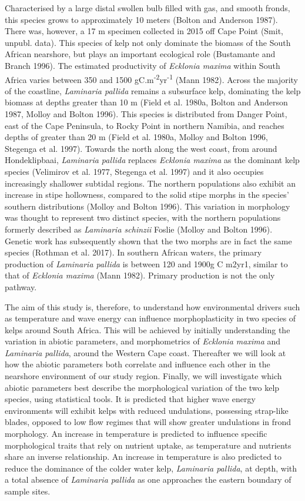 \documentclass[10pt,a4,]{article}
\begin{document}
Characterised by a large distal swollen bulb filled with gas, and smooth
fronds, this species grows to approximately 10 meters (Bolton and
Anderson 1987). There was, however, a 17 m specimen collected in 2015
off Cape Point (Smit, unpubl. data). This species of kelp not only
dominate the biomass of the South African nearshore, but plays an
important ecological role (Bustamante and Branch 1996). The estimated
productivity of \emph{Ecklonia maxima} within South Africa varies
between 350 and 1500 gC.m\textsuperscript{-2}yr\textsuperscript{-1}
(Mann 1982). Across the majority of the coastline, \emph{Laminaria
pallida} remains a subsurface kelp, dominating the kelp biomass at
depths greater than 10 m (Field et al. 1980a, Bolton and Anderson 1987,
Molloy and Bolton 1996). This species is distributed from Danger Point,
east of the Cape Peninsula, to Rocky Point in northern Namibia, and
reaches depths of greater than 20 m (Field et al. 1980a, Molloy and
Bolton 1996, Stegenga et al. 1997). Towards the north along the west
coast, from around Hondeklipbaai, \emph{Laminaria pallida} replaces
\emph{Ecklonia maxima} as the dominant kelp species (Velimirov et al.
1977, Stegenga et al. 1997) and it also occupies increasingly shallower
subtidal regions. The northern populations also exhibit an increase in
stipe hollowness, compared to the solid stipe morphs in the species'
southern distributions (Molloy and Bolton 1996). This variation in
morphology was thought to represent two distinct species, with the
northern populations formerly described as \emph{Laminaria schinzii}
Foslie (Molloy and Bolton 1996). Genetic work has subsequently shown
that the two morphs are in fact the same species (Rothman et al. 2017).
In southern African waters, the primary production of \emph{Laminaria
pallida} is between 120 and 1900g C m2yr1, similar to that of
\emph{Ecklonia maxima} (Mann 1982). Primary production is not the only
pathway.

The aim of this study is, therefore, to understand how environmental
drivers such as temperature and wave energy can influence
morphoplasticity in two species of kelps around South Africa. This will
be achieved by initially understanding the variation in abiotic
parameters, and morphometrics of \emph{Ecklonia maxima} and
\emph{Laminaria pallida}, around the Western Cape coast. Thereafter we
will look at how the abiotic parameters both correlate and influence
each other in the nearshore environment of our study region. Finally, we
will investigate which abiotic parameters best describe the
morphological variation of the two kelp species, using statistical
tools. It is predicted that higher wave energy environments will exhibit
kelps with reduced undulations, possessing strap-like blades, opposed to
low flow regimes that will show greater undulations in frond morphology.
An increase in temperature is predicted to influence specific
morphological traits that rely on nutrient uptake, as temperature and
nutrients share an inverse relationship. An increase in temperature is
also predicted to reduce the dominance of the colder water kelp,
\emph{Laminaria pallida}, at depth, with a total absence of
\emph{Laminaria pallida} as one approaches the eastern boundary of
sample sites.
\end{document}
